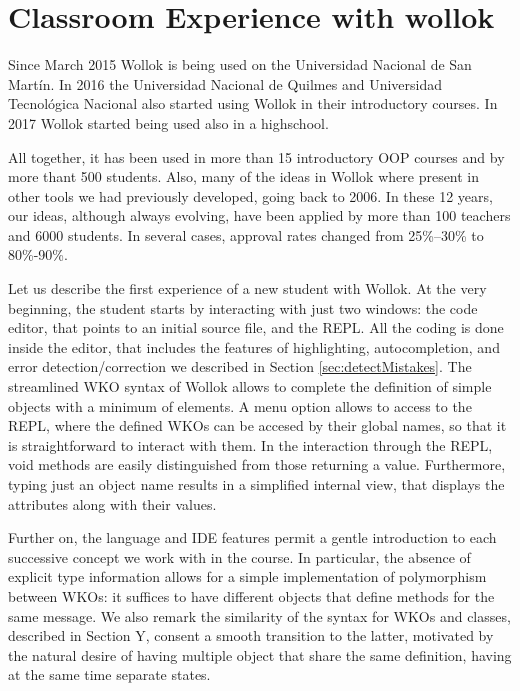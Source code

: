 \section{Classroom Experience with wollok}
\label{sec:experience}

Since March 2015 Wollok is being used on the Universidad Nacional de San Martín. 
In 2016 the Universidad Nacional de Quilmes and Universidad Tecnológica Nacional also started using Wollok in their introductory courses.
In 2017 Wollok started being used also in a highschool. 

All together, it has been used in more than 15 introductory OOP courses and by more thant 500 students.
Also, many of the ideas in Wollok where present in other tools we had previously developed, going back to 2006. In these 12 years, our ideas, although always evolving, have been applied by more than 100 teachers and 6000 students. 
In several cases, approval rates changed from 25\%--30\% to 80\%-90\%.

Let us describe the first experience of a new student with Wollok.
At the very beginning, the student starts by interacting with just two windows: the code editor, that points to an initial source file, and the REPL.
All the coding is done inside the editor, that includes the features of highlighting, autocompletion, and error detection/correction we described in Section \ref{sec:detectMistakes}. The streamlined WKO syntax of Wollok allows to complete the definition of simple objects with a minimum of elements. A menu option allows to access to the REPL, where the defined WKOs can be accesed by their global names, so that it is straightforward to interact with them. In the interaction through the REPL, void methods are easily distinguished from those returning a value. Furthermore, typing just an object name results in a simplified internal view, that displays the attributes along with their values.

Further on, the language and IDE features permit a gentle introduction to each successive concept we work with in the course. 
In particular, the absence of explicit type information allows for a simple implementation of polymorphism between WKOs: it suffices to have different objects that define methods for the same message.
We also remark the similarity of the syntax for WKOs and classes, described in Section Y, consent a smooth transition to the latter, motivated by the natural desire of having multiple object that share the same definition, having at the same time separate states.

